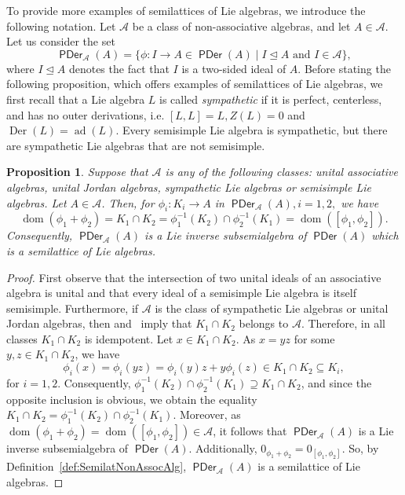 \documentclass[10pt,a4paper]{amsart}
\newtheorem{prop}[thm]{Proposition}
\theoremstyle{definition}
\theoremstyle{remark}
\numberwithin{equation}{section}
\newtheorem*{Theorem A}{\textbf{Theorem A}}
\newtheorem*{Corollary E}{\textbf{Corollary E}}
\newtheorem*{Corollary F}{\textbf{Corollary F}}
\newtheorem*{Theorem B}{\textbf{Theorem B}}
\newtheorem*{Theorem C}{\textbf{Theorem C}}
\newtheorem*{Theorem D}{\textbf{Theorem B}}
\newtheorem*{p a}{\textbf{Proof of  Theorem A}}
\newtheorem*{p b}{\textbf{Proof of Theorem B}}
\newtheorem*{p c}{\textbf{Proof of  Theorem C}}
\newtheorem*{p d}{\textbf{Proof of  Theorem D}}
\newcommand{\0}{{\vartheta}}
\DeclareMathOperator{\der}{Der}
\DeclareMathOperator{\dom}{dom}
\DeclareMathOperator{\pde}{\textsf{PDer}}
\DeclareMathOperator{\ad}{ad}
\begin{document}
To provide more examples of semilattices of Lie algebras, we introduce the following notation. Let $\mathcal{A}$ be a class of non-associative algebras, and let $A\in \mathcal A$. Let us consider the set  
$$\pde_{\mathcal A}(A)=\{\phi: I\to A\in \pde(A)\mid I\unlhd A \mbox{ and } I\in\mathcal{A}\},$$  where
$I\unlhd A$ denotes the fact that $I$ is a two-sided ideal of $A.$
Before stating the following proposition, which offers examples of semilattices of Lie algebras, we first recall that a Lie algebra $L$ is called {\em sympathetic} if it is perfect, centerless, and has no outer derivations, i.e. $[L,L]=L, Z(L)=0$ and $\der(L)=\ad (L)$. Every semisimple Lie algebra is sympathetic, but there are sympathetic Lie algebras that are not semisimple. 

\begin{prop}\label{u1}
Suppose that $\mathcal A$ is any of the following classes: unital associative algebras, unital Jordan algebras,  sympathetic Lie algebras or semisimple Lie algebras.  Let $A\in \mathcal A$. Then, for  $\phi_i:K_i\rightarrow A$ in $ \pde_{\mathcal{A}}(A), i=1,2,$ we have 
$$\dom(\phi_1+\phi_2)=K_1\cap K_2=\phi_1^{-1}(K_2)\cap \phi_2^{-1}(K_1)=\dom ([\phi_1,\phi_2]).$$
Consequently, $\pde_{\mathcal{A}}(A)$ is a  Lie inverse subsemialgebra of $\pde(A)$ which is a semilattice of Lie algebras. 
\end{prop}
\begin{proof}
First observe that the intersection of two unital ideals of an associative algebra is unital and that every ideal of a semisimple Lie algebra is itself semisimple. Furthermore, if $\mathcal{A}$ is the class of sympathetic Lie algebras or unital Jordan algebras, then  \cite[Corollary 2.11]{Cortes2023} and~\cite[Proposition 2.14(1)]{Cortes2023} imply that $K_1\cap K_2$ belongs to $\mathcal{A}$. Therefore, in all classes $K_1\cap K_2$ is idempotent. Let $x\in K_1\cap K_2.$ As $x=yz$ for some $y,z\in K_1\cap K_2$, we have
$$\phi_i(x)=\phi_i(yz)=\phi_i(y)z+y\phi_i(z)\in K_1\cap K_2\subseteq K_i,$$ for $i=1,2.$  Consequently, $\phi_1^{-1}(K_2)\cap \phi_2^{-1}(K_1)\supseteq K_1\cap K_2$, and since the opposite inclusion is obvious, we obtain the equality $K_1\cap K_2=\phi_1^{-1}(K_2)\cap \phi_2^{-1}(K_1)$. Moreover, as  $\dom(\phi_1+\phi_2)=\dom([\phi_1,\phi_2])\in \mathcal{A}$, it follows that $\pde_{\mathcal{A}}(A)$ is a  Lie inverse subsemialgebra of $\pde(A)$. Additionally,  $0_{\phi_1+\phi_2}=0_{[\phi_1,\phi_2]}$. So, by Definition~\ref{def:SemilatNonAssocAlg},   $\pde_{\mathcal{A}}(A)$ is a semilattice of Lie algebras.
\end{proof}
\end{document}
